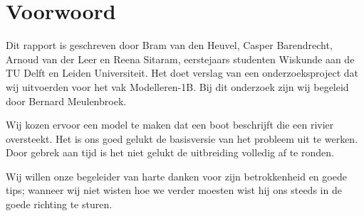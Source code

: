 \chapter*{Voorwoord}
Dit rapport is geschreven door Bram van den Heuvel, Casper Barendrecht, Arnoud van der Leer en Reena Sitaram, eerstejaars studenten Wiskunde aan de TU Delft en Leiden Universiteit. Het doet verslag van een onderzoeksproject dat wij uitvoerden voor het vak Modelleren-1B. Bij dit onderzoek zijn wij begeleid door Bernard Meulenbroek.

Wij kozen ervoor een model te maken dat een boot beschrijft die een rivier oversteekt. Het is ons goed gelukt de basisversie van het probleem uit te werken. Door gebrek aan tijd is het niet gelukt de uitbreiding volledig af te ronden. 

Wij willen onze begeleider van harte danken voor zijn betrokkenheid en goede tips; wanneer wij niet wisten hoe we verder moesten wist hij ons steeds in de goede richting te sturen.

{\\
\\}

